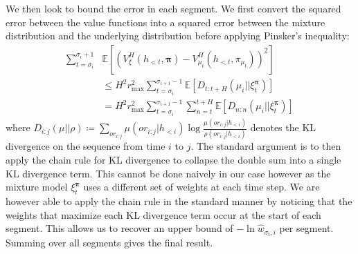 \documentclass[letterpaper]{article} %
\newcommand {\E}{\mathbb{E}}
\theoremstyle{definition}
\begin{document}
We then look to bound the error in each segment. We first convert the squared error between the value functions into a squared error between the mixture distribution and the underlying distribution before applying Pinsker's inequality:
\begin{align*}
    \sum_{t=\sigma_i}^{\sigma_i + 1} &\E \left[ \left( V_{\xi}^{H}(h_{<t}, \bm{\pi}) - V_{\mu_{t}}^{H}(h_{<t}, \pi_{\mu_t}) \right)^2 \right] \\
    &\leq H^2 r_{\max}^2 \sum_{t=\sigma_i}^{\sigma_{i+1} - 1} \E \left[ D_{t:t+H}(\mu_i || \xi^{\bm{\pi}}_t) \right]\\
    &= H^2 r_{\max}^2 \sum_{t=\sigma_i}^{\sigma_{i+1} - 1} \sum_{n=t}^{t+H} \E \left[ D_{n:n}(\mu_i || \xi^{\bm{\pi}}_t) \right]
\end{align*}
where $D_{i:j}(\mu || \rho) \coloneqq \sum_{or_{i:j}} \mu(or_{i:j} | h_{<i}) \log \frac{\mu(or_{i:j} | h_{<i})}{\rho(or_{i:j} | h_{<i})}$ denotes the KL divergence on the sequence from time $i$ to $j$. The standard argument is to then apply the chain rule for KL divergence to collapse the double sum into a single KL divergence term.
This cannot be done naively in our case however as the mixture model $\xi^{\bm{\pi}}_t$ uses a different set of weights at each time step. 
We are however able to apply the chain rule in the standard manner by noticing that the weights that maximize each KL divergence term occur at the start of each segment. This allows us to recover an upper bound of $-\ln \hat{w}_{\sigma_i, i}$ per segment. Summing over all segments gives the final result.
\end{document}
